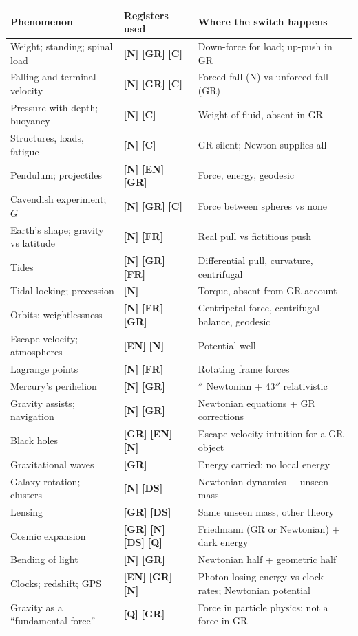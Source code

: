 \documentclass[11pt,a4paper]{article}
\newcommand{\reg}[1]{\textsf{\small\textbf{[#1]}}}
\newcommand{\RN}{\reg{N}}
\newcommand{\RGR}{\reg{GR}}
\newcommand{\RFR}{\reg{FR}}
\newcommand{\RC}{\reg{C}}
\newcommand{\REN}{\reg{EN}}
\newcommand{\RQ}{\reg{Q}}
\newcommand{\RDS}{\reg{DS}}
\begin{document}
\begin{longtable}{>{\raggedright\arraybackslash}p{4.6cm}>{\raggedright\arraybackslash}p{4.2cm}>{\raggedright\arraybackslash}p{5.0cm}}
\toprule
\textbf{Phenomenon} & \textbf{Registers used} & \textbf{Where the switch happens} \\
\midrule
\endhead
Weight; standing; spinal load & \RN{} \RGR{} \RC{} & Down-force for load; up-push in GR \\
Falling and terminal velocity & \RN{} \RGR{} \RC{} & Forced fall (N) vs unforced fall (GR) \\
Pressure with depth; buoyancy & \RN{} \RC{} & Weight of fluid, absent in GR \\
Structures, loads, fatigue & \RN{} \RC{} & GR silent; Newton supplies all \\
Pendulum; projectiles & \RN{} \REN{} \RGR{} & Force, energy, geodesic \\
Cavendish experiment; $G$ & \RN{} \RGR{} \RC{} & Force between spheres vs none \\
Earth's shape; gravity vs latitude & \RN{} \RFR{} & Real pull vs fictitious push \\
Tides & \RN{} \RGR{} \RFR{} & Differential pull, curvature, centrifugal \\
Tidal locking; precession & \RN{} & Torque, absent from GR account \\
Orbits; weightlessness & \RN{} \RFR{} \RGR{} & Centripetal force, centrifugal balance, geodesic \\
Escape velocity; atmospheres & \REN{} \RN{} & Potential well \\
Lagrange points & \RN{} \RFR{} & Rotating frame forces \\
Mercury's perihelion & \RN{} \RGR{} & 532$''$ Newtonian + 43$''$ relativistic \\
Gravity assists; navigation & \RN{} \RGR{} & Newtonian equations + GR corrections \\
Black holes & \RGR{} \REN{} \RN{} & Escape-velocity intuition for a GR object \\
Gravitational waves & \RGR{} & Energy carried; no local energy \\
Galaxy rotation; clusters & \RN{} \RDS{} & Newtonian dynamics + unseen mass \\
Lensing & \RGR{} \RDS{} & Same unseen mass, other theory \\
Cosmic expansion & \RGR{} \RN{} \RDS{} \RQ{} & Friedmann (GR or Newtonian) + dark energy \\
Bending of light & \RN{} \RGR{} & Newtonian half + geometric half \\
Clocks; redshift; GPS & \REN{} \RGR{} \RN{} & Photon losing energy vs clock rates; Newtonian potential \\
Gravity as a ``fundamental force'' & \RQ{} \RGR{} & Force in particle physics; not a force in GR \\
\bottomrule
\end{longtable}
\end{document}
